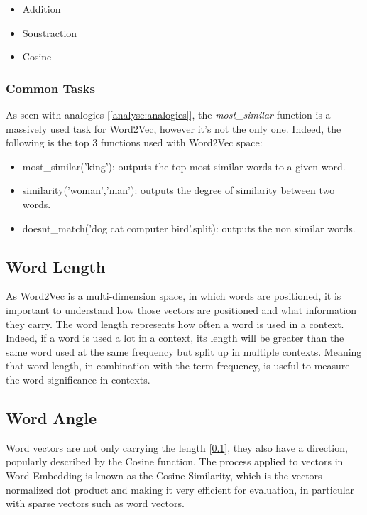 \begin{itemize}
    \setlength\itemsep{0em}
    \item Addition
    \item Soustraction
    \item Cosine
\end{itemize}

\subsubsection{Common Tasks}
\label{analyse:common-tasks}
As seen with analogies [\ref{analyse:analogies}], the \textit{most\_similar\(\)} function is a massively used task for Word2Vec, however it's not the only one. Indeed, the following is the top 3 functions used with Word2Vec space:

\begin{itemize}
    \setlength\itemsep{0em}
    \item most\_similar('king'): outputs the top most similar words to a given word.
    \item similarity('woman','man'): outputs the degree of similarity between two words.
    \item doesnt\_match('dog cat computer bird'.split\(\)): outputs the non similar words.
\end{itemize}


\subsection{Word Length}
\label{analyse:word-length}
As Word2Vec is a multi-dimension space, in which words are positioned, it is important to understand how those vectors are positioned and what information they carry. The word length represents how often a word is used in a context. Indeed, if a word is used a lot in a context, its length will be greater than the same word used at the same frequency but split up in multiple contexts. Meaning that word length, in combination with the term frequency, is useful to measure the word significance in contexts. \cite{article:word2vec-length}

\subsection{Word Angle}
\label{analyse:word-angle}
Word vectors are not only carrying the length [\ref{analyse:word-length}], they also have a direction, popularly described by the Cosine function. The process applied to vectors in Word Embedding is known as the Cosine Similarity, which is the vectors normalized dot product and making it very efficient for evaluation, in particular with sparse vectors such as word vectors.

